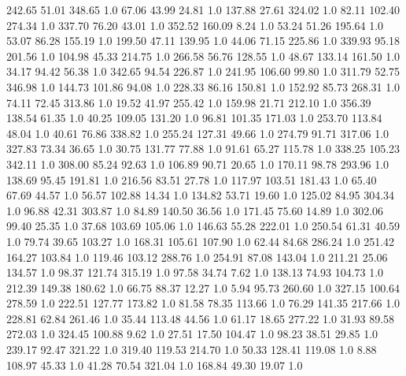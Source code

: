   242.65    51.01   348.65  1.0
   67.06    43.99    24.81  1.0
  137.88    27.61   324.02  1.0
   82.11   102.40   274.34  1.0
  337.70    76.20    43.01  1.0
  352.52   160.09     8.24  1.0
   53.24    51.26   195.64  1.0
   53.07    86.28   155.19  1.0
  199.50    47.11   139.95  1.0
   44.06    71.15   225.86  1.0
  339.93    95.18   201.56  1.0
  104.98    45.33   214.75  1.0
  266.58    56.76   128.55  1.0
   48.67   133.14   161.50  1.0
   34.17    94.42    56.38  1.0
  342.65    94.54   226.87  1.0
  241.95   106.60    99.80  1.0
  311.79    52.75   346.98  1.0
  144.73   101.86    94.08  1.0
  228.33    86.16   150.81  1.0
  152.92    85.73   268.31  1.0
   74.11    72.45   313.86  1.0
   19.52    41.97   255.42  1.0
  159.98    21.71   212.10  1.0
  356.39   138.54    61.35  1.0
   40.25   109.05   131.20  1.0
   96.81   101.35   171.03  1.0
  253.70   113.84    48.04  1.0
   40.61    76.86   338.82  1.0
  255.24   127.31    49.66  1.0
  274.79    91.71   317.06  1.0
  327.83    73.34    36.65  1.0
   30.75   131.77    77.88  1.0
   91.61    65.27   115.78  1.0
  338.25   105.23   342.11  1.0
  308.00    85.24    92.63  1.0
  106.89    90.71    20.65  1.0
  170.11    98.78   293.96  1.0
  138.69    95.45   191.81  1.0
  216.56    83.51    27.78  1.0
  117.97   103.51   181.43  1.0
   65.40    67.69    44.57  1.0
   56.57   102.88    14.34  1.0
  134.82    53.71    19.60  1.0
  125.02    84.95   304.34  1.0
   96.88    42.31   303.87  1.0
   84.89   140.50    36.56  1.0
  171.45    75.60    14.89  1.0
  302.06    99.40    25.35  1.0
   37.68   103.69   105.06  1.0
  146.63    55.28   222.01  1.0
  250.54    61.31    40.59  1.0
   79.74    39.65   103.27  1.0
  168.31   105.61   107.90  1.0
   62.44    84.68   286.24  1.0
  251.42   164.27   103.84  1.0
  119.46   103.12   288.76  1.0
  254.91    87.08   143.04  1.0
  211.21    25.06   134.57  1.0
   98.37   121.74   315.19  1.0
   97.58    34.74     7.62  1.0
  138.13    74.93   104.73  1.0
  212.39   149.38   180.62  1.0
   66.75    88.37    12.27  1.0
    5.94    95.73   260.60  1.0
  327.15   100.64   278.59  1.0
  222.51   127.77   173.82  1.0
   81.58    78.35   113.66  1.0
   76.29   141.35   217.66  1.0
  228.81    62.84   261.46  1.0
   35.44   113.48    44.56  1.0
   61.17    18.65   277.22  1.0
   31.93    89.58   272.03  1.0
  324.45   100.88     9.62  1.0
   27.51    17.50   104.47  1.0
   98.23    38.51    29.85  1.0
  239.17    92.47   321.22  1.0
  319.40   119.53   214.70  1.0
   50.33   128.41   119.08  1.0
    8.88   108.97    45.33  1.0
   41.28    70.54   321.04  1.0
  168.84    49.30    19.07  1.0
